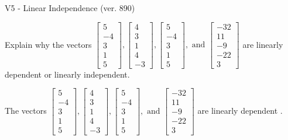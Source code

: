 \begin{exercise}
  \begin{exerciseTitle}V5 - Linear Independence (ver. 890)\end{exerciseTitle}
  \begin{exerciseStatement}
    Explain why the vectors \(\left[\begin{array}{r}
5 \\
-4 \\
3 \\
1 \\
5
\end{array}\right] , \left[\begin{array}{r}
4 \\
3 \\
1 \\
4 \\
-3
\end{array}\right] , \left[\begin{array}{r}
5 \\
-4 \\
3 \\
1 \\
5
\end{array}\right] , \text{ and } \left[\begin{array}{r}
-32 \\
11 \\
-9 \\
-22 \\
3
\end{array}\right]\) are linearly dependent or linearly independent.	


  \end{exerciseStatement}
  \begin{exerciseAnswer}
   The vectors \(\left[\begin{array}{r}
5 \\
-4 \\
3 \\
1 \\
5
\end{array}\right] , \left[\begin{array}{r}
4 \\
3 \\
1 \\
4 \\
-3
\end{array}\right] , \left[\begin{array}{r}
5 \\
-4 \\
3 \\
1 \\
5
\end{array}\right] , \text{ and } \left[\begin{array}{r}
-32 \\
11 \\
-9 \\
-22 \\
3
\end{array}\right]\) are 
  	 linearly dependent  .
  


  \end{exerciseAnswer}
\end{exercise}